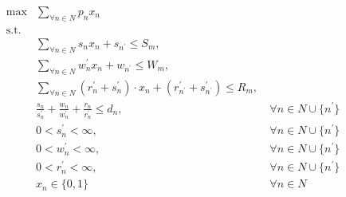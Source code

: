 \begin{align}
    \max & \sum_{\forall n \in N} p_n x_n\label{eq:dia-objective}\\
    \mbox{s.t.} \nonumber \\
    & \sum_{\forall n \in N} s_n x_n + s_{n^{'}} \leq S_m,\label{eq:dia-server-storage-constraint}\\
    & \sum_{\forall n \in N} w^{'}_n x_n + w_{n^{'}} \leq W_m, \label{eq:dia-server-computation-constraint}\\
    & \sum_{\forall n \in N} (r^{'}_n + s^{'}_n) \cdot x_n + (r^{'}_{n^{'}} + s^{'}_{n^{'}}) \leq R_m, \label{eq:dia-server-communication-constraint}\\
    & \frac{s_n}{s^{'}_n} + \frac{w_n}{w^{'}_n} + \frac{r_n}{r^{'}_n} \leq d_n, &~ \forall n \in N \cup \{n^{'}\} \label{eq:dia-task-deadline}\\
    & 0 < s^{'}_n < \infty, &~ \forall{n \in N \cup \{n^{'}\}} \label{eq:dia-loading-speeds}\\
    & 0 < w^{'}_n < \infty, &~ \forall{n \in N \cup \{n^{'}\}} \label{eq:dia-compute-speeds}\\
    & 0 < r^{'}_n < \infty, &~ \forall{n \in N \cup \{n^{'}\}} \label{eq:dia-sending-speeds}\\
    & x_n \in \{0,1\} &~ \forall{n \in N} \label{eq:dia-task-allocation}
\end{align}

